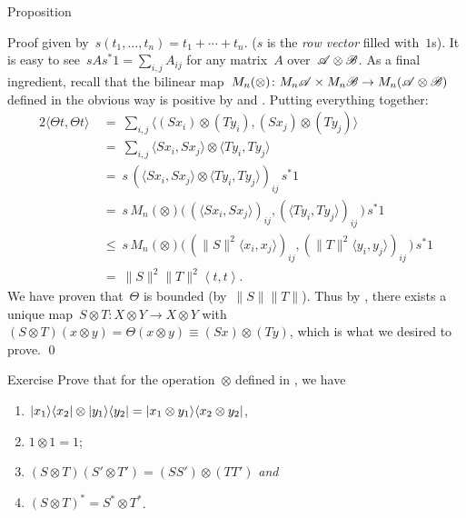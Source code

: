 \documentclass[b]{subfiles}
\begin{document}
\begin{parsec}
\begin{point}{Proposition}
\begin{point}{Proof}
    given by~$s(t_1, \ldots, t_n) = t_1 + \cdots + t_n$.
    ($s$ is the \emph{row vector} filled with~$1$s).
It is easy to see~$s A s^* 1= \sum_{i,j} A_{ij}$
    for any matrix~$A$ over~$\mathscr{A} \otimes \mathscr{B}$.
As a final ingredient,
    recall that the
    bilinear map~$M_n(\otimes) \colon M_n \mathscr{A} \times M_n \mathscr{B} \to
                M_n( \mathscr{A} \otimes \mathscr{B})$
        defined in the obvious way
        is positive by  and .
    Putting everything together:
\begin{alignat*}{2}
    \langle \Theta t, \Theta t \rangle
        & \ = \ \sum_{i,j} \langle 
    (Sx_i) \otimes (Ty_i),
    (Sx_j) \otimes (Ty_j)
            \rangle  \\
        & \ = \ \sum_{i,j} 
    \langle Sx_i, S x_j \rangle
    \otimes \langle Ty_i, T y_j \rangle \\
    & \ = \ 
    s \,
    \left( 
    \langle Sx_i, S x_j \rangle
    \otimes \langle Ty_i, T y_j \rangle
\right)_{ij}  \,
     s^*1 \\
    & \ = \ 
     s \,
M_n(\otimes) \bigl(\,
    \left( 
    \langle Sx_i, S x_j \rangle \right)_{ij},
\left( \langle Ty_i, T y_j \rangle \right)_{ij} \,\bigr) 
\, s^*1 \\
    & \ \leq \ 
s \,
M_n(\otimes) \bigl(\,
    ( 
    \|S\|^2 \langle x_i,  x_j \rangle )_{ij},
(\|T\|^2 \langle y_i,  y_j \rangle )_{ij} \,\bigr) 
\, s^*1 \\
        & \ = \
    \|S\|^2\|T\|^2 \left<t,t\right>.
\end{alignat*}
We have proven that~$\Theta$ is bounded (by~$\|S\|\|T\|$).
Thus by ,
    there exists a unique map~$S \otimes T \colon X\otimes Y \to X\otimes Y$
    with~$(S \otimes T) (x \otimes y) = \Theta(x \otimes y)
        \equiv (S x) \otimes (Ty)$,
        which is what we desired to prove. \qed
\end{point}
\end{point}
\begin{point}[hilbmod-tensor-ketbra]{Exercise}%
Prove that for the
operation~$\otimes$ defined in , we have
\begin{enumerate}
    \item $\left|x_1\right>\!\left<x_2\right| \otimes \left|y_1\right>\!\left<y_2\right|
            = \left|x_1\otimes y_1\right>\!\left<x_2\otimes y_2\right|$,
        \item $1 \otimes 1 = 1$;
    \item $(S \otimes T) (S' \otimes T') = (SS' ) \otimes (TT')$
                \emph{and}
            \item $(S \otimes T)^* = S^* \otimes T^*$.


\end{enumerate}
\end{point}
\end{parsec}
\end{document}
